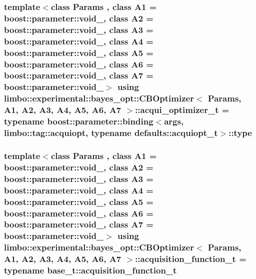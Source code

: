 \subsubsection[{\texorpdfstring{acqui\+\_\+optimizer\+\_\+t}{acqui_optimizer_t}}]{\setlength{\rightskip}{0pt plus 5cm}template$<$class Params , class A1  = boost\+::parameter\+::void\+\_\+, class A2  = boost\+::parameter\+::void\+\_\+, class A3  = boost\+::parameter\+::void\+\_\+, class A4  = boost\+::parameter\+::void\+\_\+, class A5  = boost\+::parameter\+::void\+\_\+, class A6  = boost\+::parameter\+::void\+\_\+, class A7  = boost\+::parameter\+::void\+\_\+$>$ using {\bf limbo\+::experimental\+::bayes\+\_\+opt\+::\+C\+B\+Optimizer}$<$ Params, A1, A2, A3, A4, A5, A6, A7 $>$\+::{\bf acqui\+\_\+optimizer\+\_\+t} =  typename boost\+::parameter\+::binding$<${\bf args}, limbo\+::tag\+::acquiopt, typename {\bf defaults\+::acquiopt\+\_\+t}$>$\+::type}\hypertarget{classlimbo_1_1experimental_1_1bayes__opt_1_1_c_b_optimizer_aa3b86d243d0d118a1c2f39bb00663c80}{}\label{classlimbo_1_1experimental_1_1bayes__opt_1_1_c_b_optimizer_aa3b86d243d0d118a1c2f39bb00663c80}
\subsubsection[{\texorpdfstring{acquisition\+\_\+function\+\_\+t}{acquisition_function_t}}]{\setlength{\rightskip}{0pt plus 5cm}template$<$class Params , class A1  = boost\+::parameter\+::void\+\_\+, class A2  = boost\+::parameter\+::void\+\_\+, class A3  = boost\+::parameter\+::void\+\_\+, class A4  = boost\+::parameter\+::void\+\_\+, class A5  = boost\+::parameter\+::void\+\_\+, class A6  = boost\+::parameter\+::void\+\_\+, class A7  = boost\+::parameter\+::void\+\_\+$>$ using {\bf limbo\+::experimental\+::bayes\+\_\+opt\+::\+C\+B\+Optimizer}$<$ Params, A1, A2, A3, A4, A5, A6, A7 $>$\+::{\bf acquisition\+\_\+function\+\_\+t} =  typename {\bf base\+\_\+t\+::acquisition\+\_\+function\+\_\+t}}\hypertarget{classlimbo_1_1experimental_1_1bayes__opt_1_1_c_b_optimizer_a3bef2b5e755af502e47a669dce9398f9}{}\label{classlimbo_1_1experimental_1_1bayes__opt_1_1_c_b_optimizer_a3bef2b5e755af502e47a669dce9398f9}
